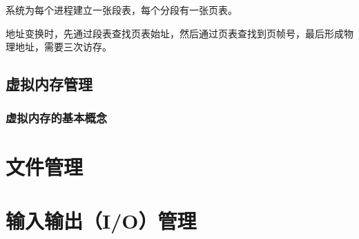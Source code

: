 \documentclass[12pt, a4paper, oneside]{ctexart}
\begin{document}
系统为每个进程建立一张段表，每个分段有一张页表。

地址变换时，先通过段表查找页表始址，然后通过页表查找到页帧号，最后形成物理地址，需要三次访存。

\subsection{虚拟内存管理}

\subsubsection{虚拟内存的基本概念}



\section{文件管理}

\section{输入输出（I/O）管理}
\end{document}
